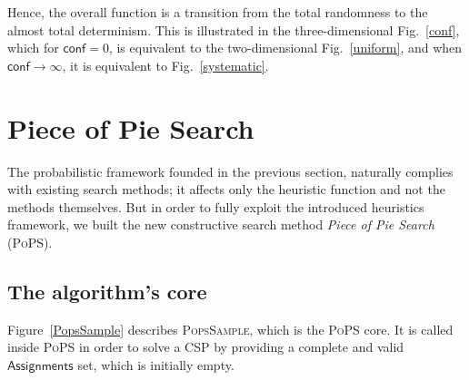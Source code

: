 \documentclass{ws-ijait}
\begin{document}
Hence, the overall function is a transition from the total
randomness to the almost total determinism. This is
illustrated in the three-dimensional Fig.~\ref{conf}, which
for $\mathsf{conf} = 0$, is equivalent to the
two-dimensional Fig.~\ref{uniform}, and when $\mathsf{conf}
\to \infty$, it is equivalent to Fig.~\ref{systematic}.


\section{Piece of Pie Search}

The probabilistic framework founded in the previous section,
naturally complies with existing search methods; it affects
only the heuristic function and not the methods themselves.
But in order to fully exploit the introduced heuristics
framework, we built the new constructive search method
\emph{Piece of Pie Search} (\textsc{PoPS}).

\subsection{The algorithm's core}

Figure~\ref{PopsSample} describes \textsc{PopsSample}, which
is the \textsc{PoPS} core. It is called inside \textsc{PoPS}
in order to solve a CSP by providing a complete and valid
$\mathsf{Assignments}$ set, which is initially empty.
\end{document}
